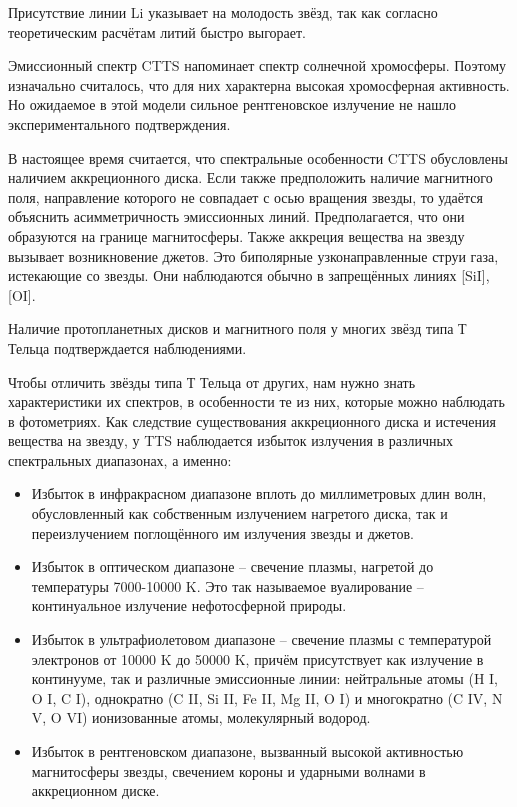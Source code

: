 Присутствие линии Li указывает на молодость звёзд, так как согласно теоретическим расчётам литий быстро выгорает.

Эмиссионный спектр CTTS напоминает спектр солнечной хромосферы. Поэтому изначально считалось, что для них характерна высокая хромосферная активность. Но ожидаемое в этой модели сильное рентгеновское излучение не нашло экспериментального подтверждения.

В настоящее время считается, что спектральные особенности CTTS обусловлены наличием аккреционного диска. Если также предположить наличие магнитного поля, направление которого не совпадает с осью вращения звезды, то удаётся объяснить асимметричность эмиссионных линий. Предполагается, что они образуются на границе магнитосферы. Также аккреция вещества на звезду вызывает возникновение джетов. Это биполярные узконаправленные струи газа, истекающие со звезды. Они наблюдаются обычно в запрещённых линиях [SiI], [OI].

Наличие протопланетных дисков и магнитного поля у многих звёзд типа Т Тельца подтверждается наблюдениями.

Чтобы отличить звёзды типа Т Тельца от других, нам нужно знать характеристики их спектров, в особенности те из них, которые можно наблюдать в фотометриях. Как следствие существования аккреционного диска и истечения вещества на звезду, у TTS наблюдается избыток излучения в различных спектральных диапазонах, а именно:
\begin{itemize}
	\item Избыток в инфракрасном диапазоне вплоть до миллиметровых длин волн, обусловленный как собственным излучением нагретого диска, так и переизлучением поглощённого им излучения звезды и джетов.
	\item Избыток в оптическом диапазоне – свечение плазмы, нагретой до температуры 7000-10000 K. Это так называемое вуалирование -- континуальное излучение нефотосферной природы. 
	\item Избыток в ультрафиолетовом диапазоне -- свечение плазмы с температурой электронов от 10000 K до 50000 K, причём присутствует как излучение в континууме, так и различные эмиссионные линии: нейтральные атомы (H I, O I, C I), однократно (C II, Si II, Fe II, Mg II, O I) и многократно (C IV, N V, O VI) ионизованные атомы, молекулярный водород.
	\item Избыток в рентгеновском диапазоне, вызванный высокой активностью магнитосферы звезды, свечением короны и ударными волнами в аккреционном диске.
\end{itemize}

